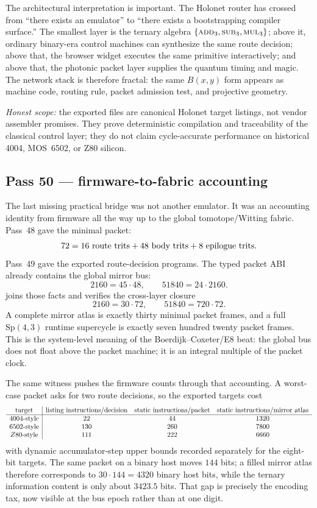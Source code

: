 \documentclass[11pt]{article}
\begin{document}
The architectural interpretation is important.  The Holonet router has crossed
from ``there exists an emulator'' to ``there exists a bootstrapping compiler
surface.''  The smallest layer is the ternary algebra
\(\{\textsc{add}_3,\textsc{sub}_3,\textsc{mul}_3\}\); above it, ordinary
binary-era control machines can synthesize the same route decision; above
that, the browser widget executes the same primitive interactively; and above
that, the photonic packet layer supplies the quantum timing and magic.  The
network stack is therefore fractal: the same \(B(x,y)\) form appears as
machine code, routing rule, packet admission test, and projective geometry.

\emph{Honest scope:} the exported files are canonical Holonet target listings,
not vendor assembler promises.  They prove deterministic compilation and
traceability of the classical control layer; they do not claim cycle-accurate
performance on historical 4004, MOS~6502, or Z80 silicon.

\subsection{Pass 50 --- firmware-to-fabric accounting}
\label{sec:capstone-fifty}

The last missing practical bridge was not another emulator.  It was an
accounting identity from firmware all the way up to the global tomotope/Witting
fabric.  Pass~48 gave the minimal packet:
\[
  72 = 16\ \hbox{route trits}+48\ \hbox{body trits}+8\ \hbox{epilogue trits}.
\]
Pass~49 gave the exported route-decision programs.  The typed packet ABI
already contains the global mirror bus:
\[
  2160 = 45\cdot48,\qquad 51840 = 24\cdot2160 .
\]
 joins those facts and
verifies the cross-layer closure
\[
  2160 = 30\cdot72,\qquad 51840 = 720\cdot72 .
\]
A complete mirror atlas is exactly thirty minimal packet frames, and a full
\(\mathrm{Sp}(4,3)\) runtime supercycle is exactly seven hundred twenty packet
frames.  This is the system-level meaning of the Boerdijk--Coxeter/E8 beat:
the global bus does not float above the packet machine; it is an integral
multiple of the packet clock.

The same witness pushes the firmware counts through that accounting.  A
worst-case packet asks for two route decisions, so the exported targets cost
\[
\begin{array}{c|ccc}
\hbox{target} & \hbox{listing instructions/decision} &
\hbox{static instructions/packet} & \hbox{static instructions/mirror atlas}\\
\hline
4004\hbox{-style} & 22 & 44 & 1320\\
6502\hbox{-style} & 130 & 260 & 7800\\
Z80\hbox{-style} & 111 & 222 & 6660
\end{array}
\]
with dynamic accumulator-step upper bounds recorded separately for the
eight-bit targets.  The same packet on a binary host moves \(144\) bits; a
filled mirror atlas therefore corresponds to \(30\cdot144=4320\) binary host
bits, while the ternary information content is only about \(3423.5\) bits.
That gap is precisely the encoding tax, now visible at the bus epoch rather
than at one digit.
\end{document}

